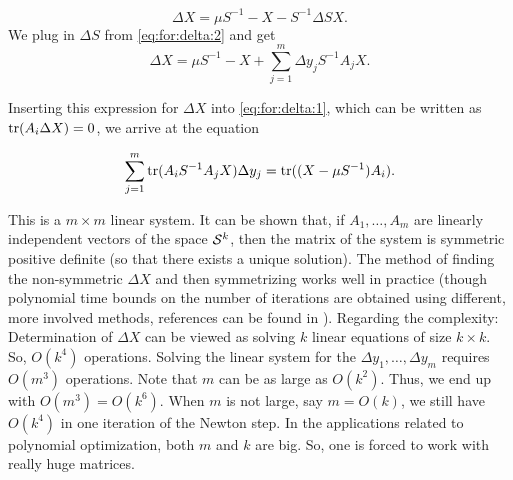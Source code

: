 \[
	\Delta{X} = \mu S^{-1} - X - S^{-1} \Delta{S} X.
\]
We plug in $\Delta{S}$ from \eqref{eq:for:delta:2} and get 
\[
	\Delta{X} = \mu S^{-1} - X + \sum_{j=1}^m \Delta{y}_j S^{-1} A_j X.
\]

Inserting this expression for $\Delta{X}$ into \eqref{eq:for:delta:1}, which can be written as \mbox{$\operatorname{tr}(A_i \Delta{X}) = 0$}, we arrive at the equation 

\[
	\sum_{j=1}^m \operatorname{tr}(A_i S^{-1} A_j X) \Delta{y}_j = \operatorname{tr}((X - \mu S^{-1}) A_i).
\]

This is a $m \times m$ linear system. It can be shown that, if $A_1,\ldots,A_m$ are linearly independent vectors of the space $\mathcal{S}^k$, then the matrix of the system is symmetric positive definite (so that there exists a unique solution). The method of finding the non-symmetric $\Delta X$ and then symmetrizing works well in practice (though polynomial time bounds on the number of iterations are obtained using different, more involved methods, references can be found in \cite{Gaertner:Matousek:2012}). Regarding the complexity: Determination of $\Delta{X}$ can be viewed as solving $k$ linear equations of size $k \times k$. So, $O(k^4)$ operations. Solving the linear system for the $\Delta{y}_1,\ldots,\Delta{y}_m$ requires $O(m^3)$ operations. Note that $m$ can be as large as $O(k^2)$. Thus, we end up with $O(m^3) = O(k^6)$. When $m$ is not large, say $m=O(k)$, we still have $O(k^4)$ in one iteration of the Newton step. In the applications related to polynomial optimization, both $m$ and $k$ are big. So, one is forced to work with really huge matrices.
